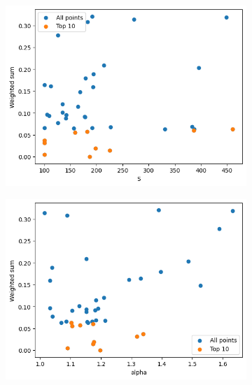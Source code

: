 \begin{frame}
\begin{figure}
        \hfill
        \begin{subfigure}{0.45\textwidth}
            \includegraphics[width=\textwidth]{../images/report/wall-S.png}
        \end{subfigure}
        \hfill
        \begin{subfigure}{0.45\textwidth}
            \includegraphics[width=\textwidth]{../images/report/wall-alpha.png}
        \end{subfigure}
        \hfill
    \end{figure}
\end{frame}

